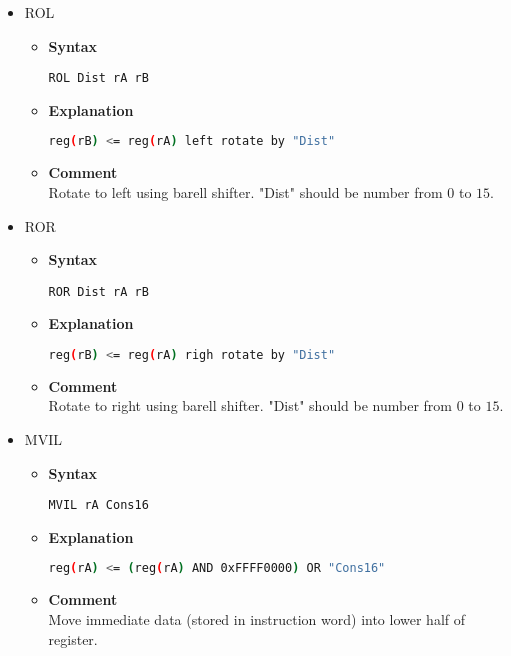 \begin{itemize}
    \item ROL
    \begin{itemize}
        \item \textbf{Syntax}
        \begin{lstlisting}[language={[x86masm]Assembler}, frame=single]
    ROL Dist rA rB
        \end{lstlisting}
        \item \textbf{Explanation}
        \begin{lstlisting}[language=bash, frame=single]
    reg(rB) <= reg(rA) left rotate by "Dist"
        \end{lstlisting}
        \item \textbf{Comment} \\
    Rotate to left using barell shifter. "Dist" should be number from $0$ to $15$.
    \end{itemize}

    \item ROR
    \begin{itemize}
        \item \textbf{Syntax}
        \begin{lstlisting}[language={[x86masm]Assembler}, frame=single]
    ROR Dist rA rB
        \end{lstlisting}
        \item \textbf{Explanation}
        \begin{lstlisting}[language=bash, frame=single]
    reg(rB) <= reg(rA) righ rotate by "Dist"
        \end{lstlisting}
        \item \textbf{Comment} \\
    Rotate to right using barell shifter. "Dist" should be number from $0$ to $15$.
    \end{itemize}

    \item MVIL
    \begin{itemize}
        \item \textbf{Syntax}
        \begin{lstlisting}[language={[x86masm]Assembler}, frame=single]
    MVIL rA Cons16
        \end{lstlisting}
        \item \textbf{Explanation}
        \begin{lstlisting}[language=bash, frame=single]
    reg(rA) <= (reg(rA) AND 0xFFFF0000) OR "Cons16"
        \end{lstlisting}
        \item \textbf{Comment} \\
    Move immediate data (stored in instruction word) into lower half of register.
    \end{itemize}


\end{itemize}
